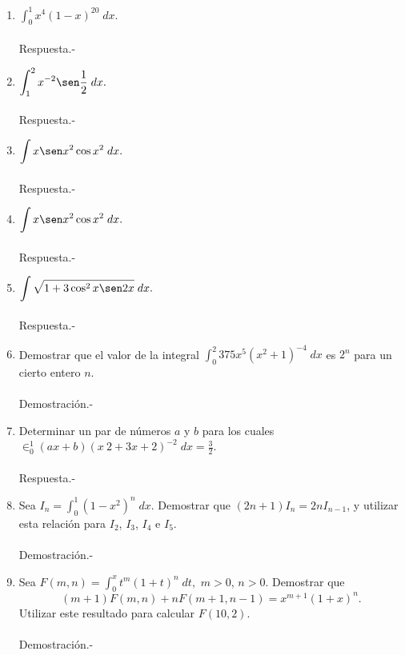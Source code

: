 \begin{enumerate}[\bfseries 1.]
    \item $\displaystyle\int_0^1 x^4(1-x)^{20}\; dx.$\\\\
	Respuesta.-\;

    \item $\displaystyle\int_1^2 x^{-2} \sen \dfrac{1}{2}\; dx.$\\\\
	Respuesta.-\;

    \item $\displaystyle\int x\sen x^2 \cos x^2\; dx.$\\\\
	Respuesta.-\;

    \item $\displaystyle\int x\sen x^2 \cos x^2\; dx.$\\\\
	Respuesta.-\;

    \item $\displaystyle\int \sqrt{1+3\cos^2 x \sen 2x}\; dx.$\\\\
	Respuesta.-\;

    \item Demostrar que el valor de la integral $\int_0^2 375x^5\left(x^2+1\right)^{-4}\; dx$ es $2^n$ para un cierto entero $n$.\\\\
	Demostración.-\;

    \item Determinar un par de números $a$ y $b$ para los cuales $\in_0^1(ax+b)\left(x~ 2+3x+2\right)^{-2}\; dx=\frac{3}{2}$.\\\\
	Respuesta.-\;

    \item Sea $I_n = \int_0^1 \left(1-x^2\right)^n\; dx$. Demostrar que $(2n+1)I_n=2nI_{n-1}$, y utilizar esta relación para $I_2$, $I_3$, $I_4$ e $I_5$.\\\\
	Demostración.-\;

    \item Sea $F(m,n)=\int_0^x t^m(1+t)^n \; dt,$ $m>0$, $n>0$. Demostrar que
    $$(m+1)F(m,n)+nF(m+1,n-1)=x^{m+1}(1+x)^n.$$
    Utilizar este resultado para calcular $F(10,2)$.\\\\
	Demostración.-\;


\end{enumerate}

